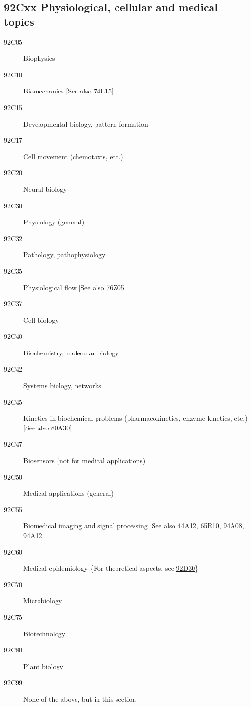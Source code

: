 \documentclass[letterpaper]{article}
\begin{document}
\subsection*{92Cxx  Physiological, cellular and medical topics }\label{92Cxx}
\begin{description}  
\item [92C05]\label{92C05} Biophysics
\item [92C10]\label{92C10} Biomechanics [See also \hyperref[74L15]{74L15}]
\item [92C15]\label{92C15} Developmental biology, pattern formation
\item [92C17]\label{92C17} Cell movement (chemotaxis, etc.)
\item [92C20]\label{92C20} Neural biology
\item [92C30]\label{92C30} Physiology (general)
\item [92C32]\label{92C32} Pathology, pathophysiology 
\item [92C35]\label{92C35} Physiological flow [See also \hyperref[76Z05]{76Z05}]
\item [92C37]\label{92C37} Cell biology
\item [92C40]\label{92C40} Biochemistry, molecular biology
\item [92C42]\label{92C42} Systems biology, networks
\item [92C45]\label{92C45} Kinetics in biochemical problems (pharmacokinetics, enzyme kinetics, etc.) [See also \hyperref[80A30]{80A30}]
\item [92C47]\label{92C47} Biosensors (not for medical applications)
\item [92C50]\label{92C50} Medical applications (general)
\item [92C55]\label{92C55} Biomedical imaging and signal processing [See also \hyperref[44A12]{44A12}, \hyperref[65R10]{65R10}, \hyperref[94A08]{94A08}, \hyperref[94A12]{94A12}]
\item [92C60]\label{92C60} Medical epidemiology \{For theoretical aspects, see \hyperref[92D30]{92D30}\}
\item [92C70]\label{92C70} Microbiology
\item [92C75]\label{92C75} Biotechnology
\item [92C80]\label{92C80} Plant biology
\item [92C99]\label{92C99} None of the above, but in this section
\end{description}
\end{document}
